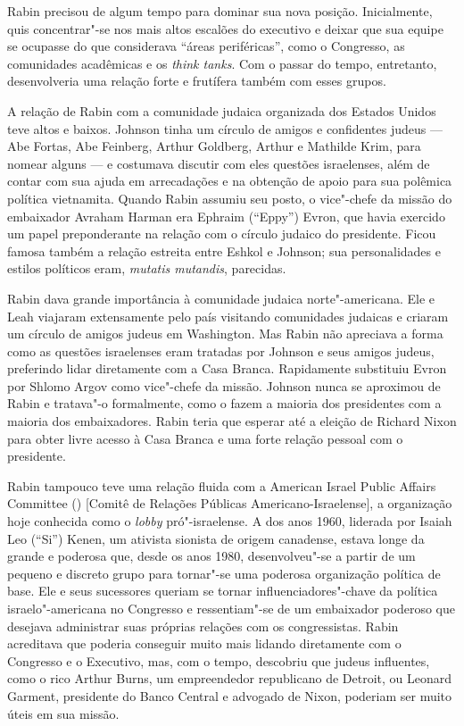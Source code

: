 Rabin precisou de algum tempo para dominar sua nova posição.
Inicialmente, quis concentrar"-se nos mais altos escalões do executivo e
deixar que sua equipe se ocupasse do que considerava ``áreas
periféricas'', como o Congresso, as comunidades acadêmicas e os
\emph{think tanks}. Com o passar do tempo, entretanto, desenvolveria uma
relação forte e frutífera também com esses grupos.

A relação de Rabin com a comunidade judaica organizada dos Estados Unidos teve
altos e baixos. Johnson tinha um círculo de amigos e confidentes judeus
--- Abe Fortas, Abe Feinberg, Arthur Goldberg, Arthur e Mathilde Krim,
para nomear alguns --- e costumava discutir com eles questões israelenses,
além de contar com sua ajuda em arrecadações e na obtenção de apoio
para sua polêmica política vietnamita. Quando Rabin assumiu seu posto, o
vice"-chefe da missão do embaixador Avraham Harman era Ephraim (``Eppy'')
Evron, que havia exercido um papel preponderante na relação com o círculo
judaico do presidente. Ficou famosa também a relação estreita entre
Eshkol e Johnson; sua personalidades e estilos políticos eram,
\emph{mutatis mutandis}, parecidas.

Rabin dava grande importância à comunidade judaica norte"-americana. Ele
e Leah viajaram extensamente pelo país visitando comunidades judaicas e
criaram um círculo de amigos judeus em Washington. Mas Rabin não
apreciava a forma como as questões israelenses eram tratadas por Johnson
e seus amigos judeus, preferindo lidar diretamente com a Casa Branca.
Rapidamente substituiu Evron por Shlomo Argov como vice"-chefe da missão.
Johnson nunca se aproximou de Rabin e tratava"-o formalmente, como o
fazem a maioria dos presidentes com a maioria dos embaixadores. Rabin
teria que esperar até a eleição de Richard Nixon para obter livre acesso
à Casa Branca e uma forte relação pessoal com o presidente.

Rabin tampouco teve uma relação fluida com a American Israel Public
Affairs Committee () {[}Comitê de Relações Públicas Americano-Israelense{]}, a organização hoje conhecida como o \emph{lobby}
pró"-israelense. A  dos anos 1960, liderada por Isaiah Leo (``Si'')
Kenen, um ativista sionista de origem canadense, estava longe da grande
e poderosa  que, desde os anos 1980, desenvolveu"-se a partir de um
pequeno e discreto grupo para tornar"-se uma poderosa organização
política de base. Ele e seus sucessores queriam se tornar
influenciadores"-chave da política israelo"-americana no Congresso e
ressentiam"-se de um embaixador poderoso que desejava administrar suas
próprias relações com os congressistas. Rabin acreditava que poderia
conseguir muito mais lidando diretamente com o Congresso e o Executivo,
mas, com o tempo, descobriu que judeus influentes, como o rico Arthur Burns,
um empreendedor republicano de Detroit, ou Leonard Garment, presidente do Banco
Central e advogado de Nixon, poderiam ser muito úteis
em sua missão.


